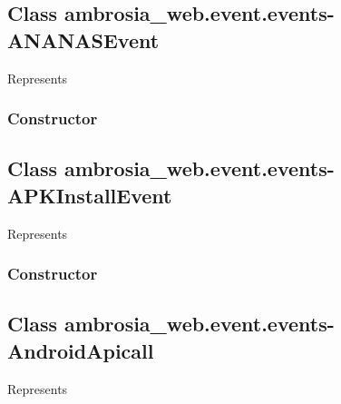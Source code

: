 \documentclass[letterpaper,10pt,english]{sphinxmanual}
\begin{document}
\subsection{Class ambrosia\_web.event.events-ANANASEvent}
\label{ambrosia_web.event.events-ANANASEvent:class-ambrosia-web-event-events-ananasevent}\label{ambrosia_web.event.events-ANANASEvent::doc}
Represents {\hyperref[ambrosia_plugins.events:ambrosia_plugins.events.ANANASEvent]{}}


\subsubsection{Constructor}
\label{ambrosia_web.event.events-ANANASEvent:constructor}

\begin{fulllineitems}
\label{ambrosia_web.event.events-ANANASEvent:ambrosia_web.event.events-ANANASEvent}
\end{fulllineitems}



\subsection{Class ambrosia\_web.event.events-APKInstallEvent}
\label{ambrosia_web.event.events-APKInstallEvent:class-ambrosia-web-event-events-apkinstallevent}\label{ambrosia_web.event.events-APKInstallEvent::doc}
Represents {\hyperref[ambrosia_plugins.lkm:ambrosia_plugins.lkm.events.APKInstallEvent]{}}


\subsubsection{Constructor}
\label{ambrosia_web.event.events-APKInstallEvent:constructor}

\begin{fulllineitems}
\label{ambrosia_web.event.events-APKInstallEvent:ambrosia_web.event.events-APKInstallEvent}
\end{fulllineitems}



\subsection{Class ambrosia\_web.event.events-AndroidApicall}
\label{ambrosia_web.event.events-AndroidApicall::doc}\label{ambrosia_web.event.events-AndroidApicall:class-ambrosia-web-event-events-androidapicall}
Represents 
\end{document}
